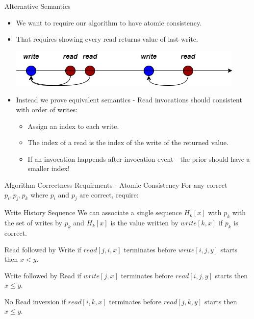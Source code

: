 \begin{frame}{Alternative Semantics}
    \begin{itemize}
        \item We want to require our algorithm to have atomic consistency.
        \pause
        \item That requires showing every read returns value of last write.
        \begin{center}
            \includegraphics[scale=.4]{resources/vanilla_semantics.png}
        \end{center}
        \pause
        \item Instead we prove equivalent semantics - Read invocations should consistent with order of writes:
        \begin{itemize}
            \pause
            \item Assign an index to each write.
            \pause
            \item The index of a read is the index of the write of the returned value.
            \pause
            \item If an invocation happends after invocation event - the prior should have a smaller index!
        \end{itemize}
    \end{itemize}
    
\end{frame}

\begin{frame}{Algorithm Correctness Requirments - Atomic Consistency}
    For any correct $p_i, p_j, p_k$ where $p_i$ and $p_j$ are correct, require:
    \begin{block}{Write History Sequence}
        We can associate a single sequence $H_k[x]$ with $p_k$ with
        the set of writes by $p_k$ and 
        $H_k[x]$ is the value written by $write[k,x]$ if $p_k$ is correct.
    \end{block}
    \pause
    \begin{block}{Read followed by Write}
        if $read[j,i,x]$ terminates before $write[i,j,y]$ starts then $x<y$.
    \end{block}
    \pause
    \begin{block}{Write followed by Read}
        if $write[j,x]$ terminates before $read[i,j,y]$ starts then $x\leq y$.
    \end{block}
    \pause
    \begin{block}{No Read inversion}
        if $read[i,k,x]$ terminates before $read[j,k,y]$ starts then $x\leq y$.
    \end{block}    
\end{frame}

